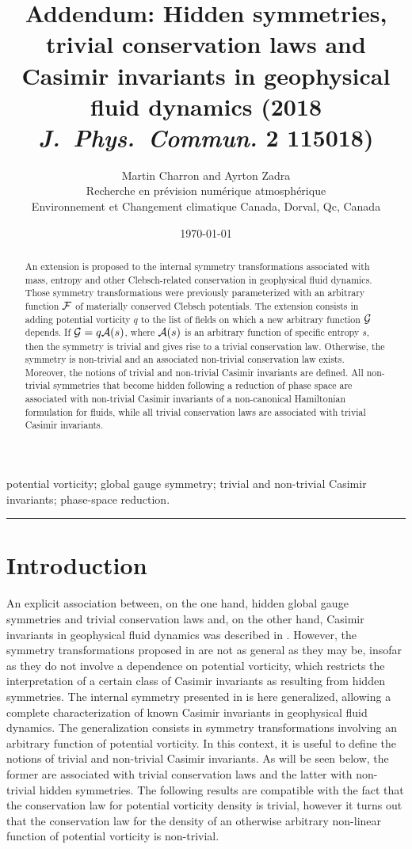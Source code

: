 \documentclass{article}
\title{{\bf Addendum: Hidden symmetries, trivial conservation laws and Casimir invariants in geophysical fluid dynamics} (2018 {\it J.\ Phys.\ Commun.} {\bf 2} 115018)}
\author{Martin Charron and Ayrton Zadra \\
	Recherche en pr\'evision num\'erique atmosph\'erique \\
	Environnement et Changement climatique Canada, Dorval, Qc, Canada}
\date{\today}
\numberwithin{equation}{section}
\providecommand{\keywords}[1]
{
  \hangindent=1.937cm
  {\small{\text{\textit{Keywords:}} #1}}
}
\begin{document}
\maketitle

\begin{abstract}
An extension is proposed to the internal symmetry transformations associated with mass, entropy and other Clebsch-related conservation in geophysical fluid dynamics. Those symmetry transformations were previously parameterized with an arbitrary function $\cal F$ of materially conserved Clebsch potentials. The extension consists in adding potential vorticity $q$ to the list of fields on which a new arbitrary function $\cal G$ depends. If ${\cal G}=q{\cal A}(s)$, where ${\cal A}(s)$ is an arbitrary function of specific entropy $s$, then the symmetry is trivial and gives rise to a trivial conservation law. Otherwise, the symmetry is non-trivial and an associated non-trivial conservation law exists. Moreover, the notions of trivial and non-trivial Casimir invariants are defined. All non-trivial symmetries that become hidden following a reduction of phase space are associated with non-trivial Casimir invariants of a non-canonical Hamiltonian formulation for fluids, while all trivial conservation laws are associated with trivial Casimir invariants.
\end{abstract}

\keywords{potential vorticity; global gauge symmetry; trivial and non-trivial Casimir invariants; phase-space reduction.}

\noindent\rule{\textwidth}{0.3pt}

\section{Introduction}
An explicit association between, on the one hand, hidden global gauge symmetries and trivial conservation laws and, on the other hand, Casimir invariants in geophysical fluid dynamics was described in \citet{Charron18b}. However, the symmetry transformations proposed in \citet{Webb17,Charron18b} are not as general as they may be, insofar as they do not involve a dependence on potential vorticity, which restricts the interpretation of a certain class of Casimir invariants as resulting from hidden symmetries. The internal symmetry presented in \citet{Charron18b} is here generalized, allowing a complete characterization of known Casimir invariants in geophysical fluid dynamics. The generalization consists in symmetry transformations involving an arbitrary function of potential vorticity. In this context, it is useful to define the notions of trivial and non-trivial Casimir invariants. As will be seen below, the former are associated with trivial conservation laws and the latter with non-trivial hidden symmetries. The following results are compatible with the fact that the conservation law for potential vorticity density is trivial, however it turns out that the conservation law for the density of an otherwise arbitrary non-linear function of potential vorticity is non-trivial.
\end{document}
